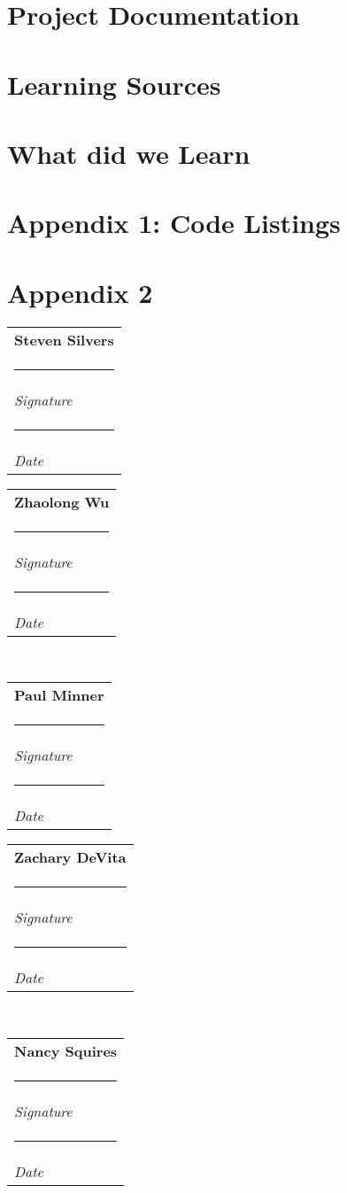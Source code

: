 \documentclass[10pt,letterpaper,onecolumn,draftclsnofoot,journal]{IEEEtran}
\makeatletter
\newcommand{\namesigdate}[2][6cm]{%
	\begin{tabular}{@{}p{#1}@{}}
		#2 \\[3\normalbaselineskip] \hrule \\[0pt]
		{\small \textit{Signature}} 
		\\[2\normalbaselineskip] \hrule \\[0pt]
		{\small \textit{Date}}
	\end{tabular}
}
\makeatother
\begin{document}
\section{Project Documentation}
\section{Learning Sources}
\section{What did we Learn}
\section{Appendix 1: Code Listings}
\section{Appendix 2}


%
%

\clearpage

\vspace{1in}
\noindent \namesigdate{\textbf{Steven Silvers}}
\hfill
\vspace{1in}
\noindent \namesigdate{\textbf{Zhaolong Wu}}
\\
\vspace{1in}
\noindent \namesigdate{\textbf{Paul Minner}}
\hfill
\vspace{1in}
\noindent \namesigdate{\textbf{Zachary DeVita}}
\\
\noindent \namesigdate{\textbf{Nancy Squires}}
\end{document}
